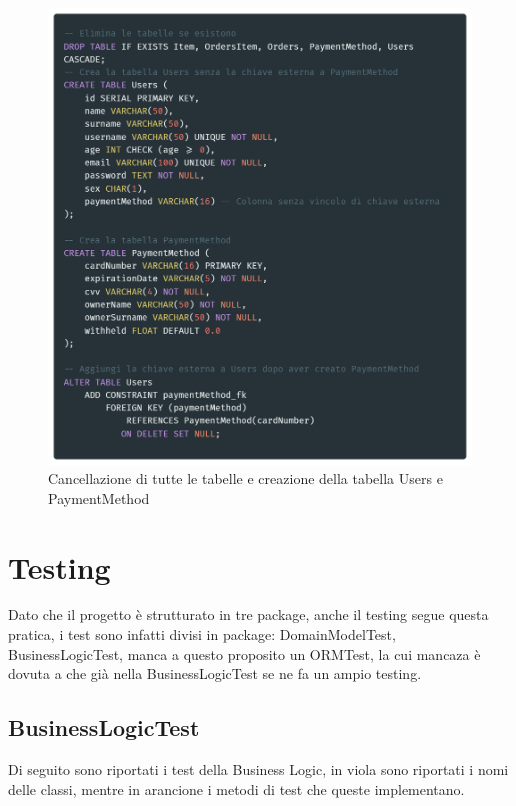 \documentclass{article}
\begin{document}
\begin{figure}[h]
    \includegraphics[width=0.9\linewidth]{imgs/snippets/Code_SQLReset.png}
    \caption{Cancellazione di tutte le tabelle e creazione della tabella Users e PaymentMethod}
    \label{code_SQLReset}
\end{figure}

\newpage

\section{Testing}
Dato che il progetto è strutturato in tre package, anche il testing segue questa pratica, i test sono infatti divisi in package: DomainModelTest, BusinessLogicTest, manca a questo proposito un ORMTest, la cui mancaza è dovuta a che già nella BusinessLogicTest se ne fa un ampio testing. 


\subsection{BusinessLogicTest}
Di seguito sono riportati i test della Business Logic, in viola sono riportati i nomi delle classi, mentre in arancione i metodi di test che queste implementano.
\end{document}

